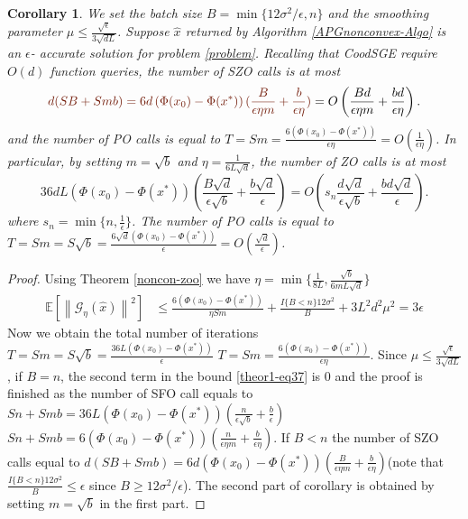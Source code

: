 \documentclass{article}
\newcommand*{\G}{\mathcal{G}}
\newcommand*{\E}{\mathbb{E}}
\newcommand{\norm}[1]{\left\lVert#1\right\rVert}
\newtheorem{corollary}[theorem]{Corollary}
\theoremstyle{definition}
\theoremstyle{remark}
\begin{document}
 \begin{corollary}\label{corr11}
We set the batch size $B = \min\{12\sigma^2/\epsilon, n\}$ and the smoothing parameter $\mu \leq \frac{\sqrt{\epsilon}}{3\sqrt{dL}}$. Suppose $\hat{x}$ returned by Algorithm \ref{APGnonconvex-Algo}  is an $\epsilon$- accurate solution for problem \eqref{problem}. Recalling that CoodSGE require $O(d)$ function queries, the number of SZO calls is at most 
\begin{equation}\label{SZO-call-nocon}
{\color{Brown}d(SB+Smb) = 6d \left(\Phi(x_0) - \Phi({x}^*)\right) (\frac{B}{\epsilon\eta m}+\frac{b}{\epsilon\eta})} = O\left(\frac{Bd}{\epsilon\eta m}+\frac{bd}{\epsilon\eta}\right).
\end{equation} 
and the number of PO calls is equal to $T = Sm = \frac{6\left(\Phi(x_0) - \Phi({x}^*)\right)}{\epsilon\eta} = O\left(\frac{1}{\epsilon\eta}\right)$. In particular, by setting $m=\sqrt{b}$ and {\color{Brown}$\eta = \frac{1}{6L\sqrt{d}}$}, the number of ZO calls is at most 
\begin{equation}\label{SZO-call-par-nocon}
36d L (\Phi(x_0)-\Phi(x^*))\left(\frac{B\sqrt{d}}{\epsilon\sqrt{b}}+\frac{b\sqrt{d}}{\epsilon}\right) = O\left(s_n\frac{d\sqrt{d}}{\epsilon \sqrt{b}}+\frac{bd\sqrt{d}}{\epsilon}\right).
\end{equation}
where $s_n = \min\{n,\frac{1}{\epsilon}\}$. The number of PO calls is equal to $T = Sm = S\sqrt{b} = \frac{6\sqrt{d}\left(\Phi(x_0) - \Phi({x}^*)\right)}{\epsilon} = O\left(\frac{\sqrt{d}}{\epsilon}\right)$. 
\end{corollary}
\begin{proof}
Using Theorem \ref{noncon-zoo} we have $\eta = \min\{\frac{1}{8L}, \frac{\sqrt{b}}{6mL\sqrt{d}}\}$
\begin{align}
\E[\norm{\G_{\eta}(\hat{x})}^2] & \leq \frac{6\left(\Phi(x_0) - \Phi({x}^*)\right)}{\eta Sm} + \frac{I\{B < n\}12 \sigma ^2}{B}+3{L^2 d^2 \mu^2} = 3\epsilon\label{theor1-eq37}
 \end{align} 
 Now we obtain the total number of iterations $T = Sm = S\sqrt{b} = \frac{36L\left(\Phi(x_0) - \Phi({x}^*)\right)}{\epsilon}$ {\color{Brown} $T = Sm = \frac{6\left(\Phi(x_0) - \Phi({x}^*)\right)}{\epsilon\eta}$}. Since $\mu \leq \frac{\sqrt{\epsilon}}{3\sqrt{dL}}$, if $B = n$, the second term in the bound \eqref{theor1-eq37} is $0$ and the proof is finished as the number of SFO call equals to $Sn+Smb = 36 L \left(\Phi(x_0) - \Phi({x}^*)\right) (\frac{n}{\epsilon\sqrt{b}}+\frac{b}{\epsilon})$ {\color{Brown}$Sn+Smb = 6 \left(\Phi(x_0) - \Phi({x}^*)\right) (\frac{n}{\epsilon\eta m}+\frac{b}{\epsilon\eta})$}. If  $B < n$ the number of SZO calls equal to  {\color{Brown}$d(SB+Smb) = 6d \left(\Phi(x_0) - \Phi({x}^*)\right) (\frac{B}{\epsilon\eta m}+\frac{b}{\epsilon\eta})$}(note that $\frac{I\{B < n\}12\sigma^2}{B} \leq \epsilon$ since $B \geq 12\sigma^2 /\epsilon$). The second part of corollary is obtained by setting $m = \sqrt{b}$ in the first part.
\end{proof}
\end{document}
